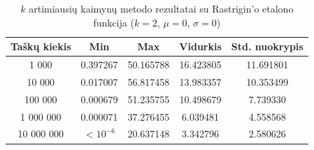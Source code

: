 \begin{table}[H]
    \centering
    \begin{tabular}{|c|c|c|c|c|}
        \hline
        \textbf{Taškų kiekis} & \textbf{Min} & \textbf{Max} & \textbf{Vidurkis} & \textbf{Std. nuokrypis} \\ \hline
        1 000        & 0.397267 & 50.165788 & 16.423805 & 11.691801 \\ \hline
        10 000       & 0.017007 & 56.817458 & 13.983357 & 10.353499 \\ \hline
        100 000      & 0.000679 & 51.235755 & 10.498679 & 7.739330 \\ \hline
        1 000 000    & 0.000071 & 37.276455 & 6.039481 & 4.558568 \\ \hline
        10 000 000   & $<10^{-6}$ & 20.637148 & 3.342796 & 2.580626 \\ \hline
    \end{tabular}
    \caption{$k$ artimiausių kaimynų metodo rezultatai su Rastrigin'o etalono funkcija ($k = 2$, $\mu = 0$, $\sigma = 0$)}
\end{table}